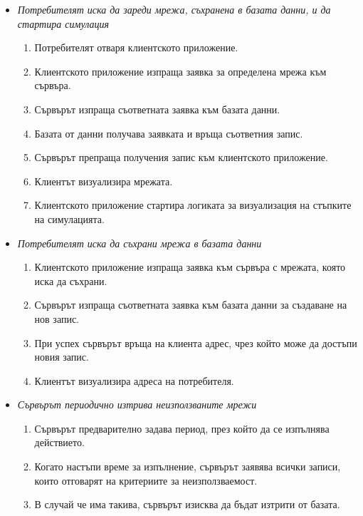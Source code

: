 \begin{itemize}
	\item \textit{Потребителят иска да зареди мрежа, съхранена в базата данни, и да стартира симулация}
	
	\begin{enumerate}
		\item Потребителят отваря клиентското приложение.
		\item Клиентското приложение изпраща заявка за определена мрежа към сървъра.
		\item Сървърът изпраща съответната заявка към базата данни.
		\item Базата от данни получава заявката и връща съответния запис.
		\item Сървърът препраща получения запис към клиентското приложение.
		\item Клиентът визуализира мрежата.
		\item Клиентското приложение стартира логиката за визуализация на стъпките на симулацията.
	\end{enumerate}
	
	
	\item\textit{Потребителят иска да съхрани мрежа в базата данни}
	\begin{enumerate}
		\item Клиентското приложение изпраща заявка към сървъра с мрежата, която иска да съхрани.
		\item Сървърът изпраща съответната заявка към базата данни за създаване на нов запис.
		\item При успех сървърът връща на клиента адрес, чрез който може да достъпи новия запис.
		\item Клиентът визуализира адреса на потребителя.
	\end{enumerate}
	
	\item \textit{Сървърът периодично изтрива неизползваните мрежи}
	\begin{enumerate}
		\item Сървърът предварително задава период, през който да се изпълнява действието.
		\item Когато настъпи време за изпълнение, сървърът заявява всички записи, които отговарят на критериите за неизползваемост.
		\item В случай че има такива, сървърът изисква да бъдат изтрити от базата.
	\end{enumerate}
	
 \end{itemize}


